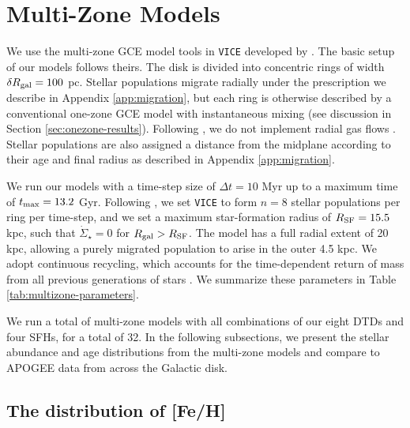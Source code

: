 \documentclass[twocolumn,twocolappendix]{aastex631}
\newcommand{\vice}{{\tt VICE}\xspace}
\begin{document}
\section{Multi-Zone Models}
\label{sec:multizone-results}

We use the multi-zone GCE model tools in \vice developed by . The basic setup of our models follows theirs. The disk is divided into concentric rings of width $\delta R_{\rm gal}=100$ pc. Stellar populations migrate radially under the prescription we describe in Appendix \ref{app:migration}, but each ring is otherwise described by a conventional one-zone GCE model with instantaneous mixing (see discussion in Section \ref{sec:onezone-results}). Following , we do not implement radial gas flows \citep[e.g.,][]{LaceyFall1985-RadialGasFlows,BilitewskiSchonrich2012-RadialFlows}. Stellar populations are also assigned a distance from the midplane according to their age and final radius as described in Appendix \ref{app:migration}.

We run our models with a time-step size of $\Delta t=10$ Myr up to a maximum time of $t_{\rm max}=13.2$ Gyr. Following , we set \vice to form $n=8$ stellar populations per ring per time-step, and we set a maximum star-formation radius of $R_{\rm SF} = 15.5$ kpc, such that $\dot\Sigma_\star=0$ for $R_{\rm gal}>R_{\rm SF}$. The model has a full radial extent of 20 kpc, allowing a purely migrated population to arise in the outer 4.5 kpc. We adopt continuous recycling, which accounts for the time-dependent return of mass from all previous generations of stars \citep[see Equation 2 from][]{JohnsonWeinberg2020-Starbursts}. We summarize these parameters in Table \ref{tab:multizone-parameters}.

We run a total of multi-zone models with all combinations of our eight DTDs and four SFHs, for a total of 32. In the following subsections, we present the stellar abundance and age distributions from the multi-zone models and compare to APOGEE data from across the Galactic disk.

\subsection{The distribution of [Fe/H]}
\label{sec:feh-df}
\end{document}
